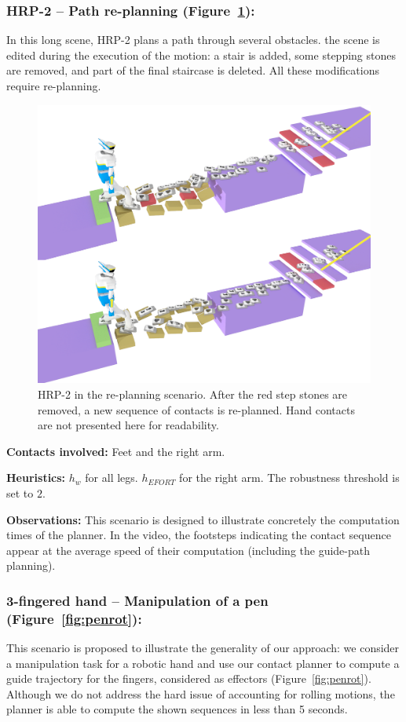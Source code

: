 \subsubsection{HRP-2 -- Path re-planning (Figure~\ref{fig:re-planning}):}
In this long scene, HRP-2 plans a path through several obstacles. the scene is edited during the execution of the motion: a stair is added,
some stepping stones are removed, and part of the final staircase is deleted. All these modifications require re-planning.


\begin{figure}
  \centering
  \includegraphics[width=0.7\linewidth]{figures/replanning}
  \caption{
           HRP-2 in the re-planning scenario. After the red step stones are removed, a new sequence of contacts is re-planned. Hand contacts
           are not presented here for readability.}
		   \label{fig:re-planning}
\end{figure}

\noindent\textbf{Contacts involved:} Feet and the right arm.

\noindent\textbf{Heuristics:} $h_w$  for all legs. $h_{EFORT}$  for the right arm. The robustness threshold is set to $2$.

\noindent\textbf{Observations:} This scenario is designed to illustrate concretely the computation times of the planner.
In the video, the footsteps indicating the contact sequence appear at the average speed of their computation (including the guide-path planning).


\subsubsection{3-fingered hand -- Manipulation of a pen (Figure~\ref{fig:penrot}):}
This scenario is proposed to illustrate the generality of our approach: we consider a manipulation task for a robotic hand and use
our contact planner to compute a guide trajectory for the fingers, considered as effectors (Figure~\ref{fig:penrot}).
Although we do not address the hard issue of accounting for rolling motions, the planner is able to compute the shown sequences in less than 5 seconds.

